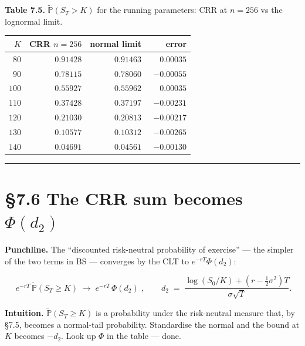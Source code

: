 \documentclass[
  10pt,
  twoside]{book}
\newcounter{none} %
\begin{document}
\textbf{Table 7.5.} \(\tilde{\mathbb P}(S_T > K)\) for the running
parameters: CRR at \(n=256\) vs the lognormal limit.

{\def\LTcaptype{none} %
\begin{table}[H]
\centering
\begin{tabular}{|r|r|r|r|}
\toprule
\(K\) & CRR \(n=256\) & normal limit & error \\
\midrule



\(\phantom{0}80\) & \(0.91428\) & \(0.91463\) &
\(\phantom{-}0.00035\) \\
\(\phantom{0}90\) & \(0.78115\) & \(0.78060\) & \(-0.00055\) \\
\(100\) & \(0.55927\) & \(0.55962\) & \(\phantom{-}0.00035\) \\
\(110\) & \(0.37428\) & \(0.37197\) & \(-0.00231\) \\
\(120\) & \(0.21030\) & \(0.20813\) & \(-0.00217\) \\
\(130\) & \(0.10577\) & \(0.10312\) & \(-0.00265\) \\
\(140\) & \(0.04691\) & \(0.04561\) & \(-0.00130\) \\
\bottomrule
\end{tabular}
\end{table}
}

\begin{center}\rule{0.5\linewidth}{0.5pt}\end{center}

\section{\texorpdfstring{§7.6 The CRR sum becomes
\(\Phi(d_2)\)}{§7.6 The CRR sum becomes \textbackslash Phi(d\_2)}}\label{the-crr-sum-becomes-phid_2}

\textbf{Punchline.} The ``discounted risk-neutral probability of
exercise'' --- the simpler of the two terms in BS --- converges by the
CLT to \(e^{-rT}\Phi(d_2)\):

\[\boxed{\; e^{-rT} \, \tilde{\mathbb P}(S_T \ge K) \;\to\; e^{-rT}\,\Phi(d_2) \;}, \qquad d_2 \;=\; \frac{\log(S_0/K) + (r - \tfrac{1}{2}\sigma^2) T}{\sigma\sqrt T}.\]

\textbf{Intuition.} \(\tilde{\mathbb P}(S_T \ge K)\) is a probability
under the risk-neutral measure that, by §7.5, becomes a normal-tail
probability. Standardise the normal and the bound at \(K\) becomes
\(-d_2\). Look up \(\Phi\) in the table --- done.
\end{document}
